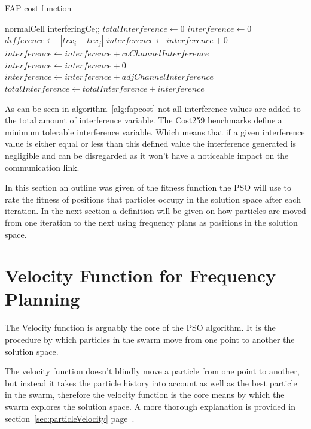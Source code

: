 \begin{algorithm}
\caption{FAP cost function}
\label{alg:fapcost}
	\begin{algorithmic}[1]
	\REQUIRE normalCell
	\REQUIRE interferingCe;;
	\STATE $totalInterference \leftarrow $0
			\STATE $interference \leftarrow 0$
			\STATE $difference \leftarrow$ $|trx_i - trx_j|$
					\STATE $interference \leftarrow interference + 0$
				\ELSE
					\STATE $interference \leftarrow interference + coChannelInterference$
				\ENDIF
			\ELSE
						\STATE $interference \leftarrow interference + 0$
					\ELSE
						\STATE $interference \leftarrow interference + adjChannelInterference$
					\ENDIF
				\ENDIF
			\ENDIF
			\STATE $totalInterference \leftarrow totalInterference + interference$
		\ENDFOR
	\ENDFOR
	\end{algorithmic}
\end{algorithm}

As can be seen in algorithm~\ref{alg:fapcost} not all interference values are added to the total amount of interference variable. The Cost259 benchmarks define a minimum tolerable interference variable. Which means that if a given interference value is either equal or less than this defined value the interference generated is negligible and can be disregarded as it won't have a noticeable impact on the communication link.

In this section an outline was given of the fitness function the PSO will use to rate the fitness of positions that particles occupy in the solution space after each iteration. In the next section a definition will be given on how particles are moved from one iteration to the next using frequency plans as positions in the solution space.
\section{Velocity Function for Frequency Planning}
\label{sec:velocityFAP}
The Velocity function is arguably the core of the PSO algorithm. It is the procedure by which particles in the swarm move from one point to another the solution space. 

The velocity function doesn't blindly move a particle from one point to another, but instead it takes the particle history into account as well as the best particle in the swarm, therefore the velocity function is the core means by which
the swarm explores the solution space. A more thorough explanation is provided in section~\ref{sec:particleVelocity} page~\pageref{sec:particleVelocity}.

